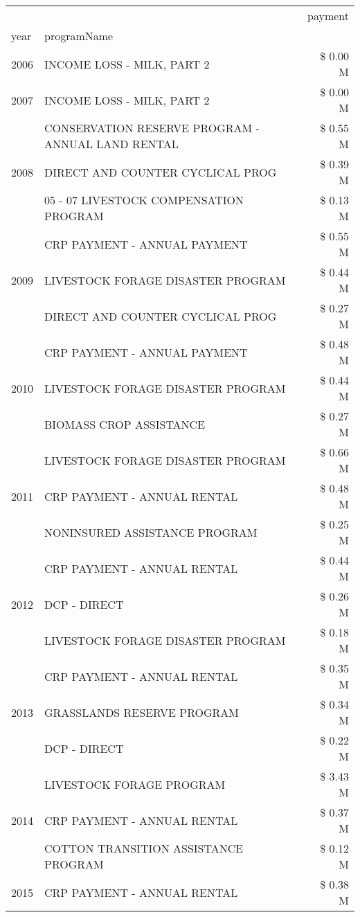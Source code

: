 \begin{tabular}{llr}
\toprule
 &  & payment \\
year & programName &  \\
\midrule
2006 & INCOME LOSS - MILK, PART 2 & \$ 0.00 M \\
\cline{1-3}
2007 & INCOME LOSS - MILK, PART 2 & \$ 0.00 M \\
\cline{1-3}
\multirow[t]{3}{*}{2008} & CONSERVATION RESERVE PROGRAM - ANNUAL LAND RENTAL & \$ 0.55 M \\
 & DIRECT AND COUNTER CYCLICAL PROG & \$ 0.39 M \\
 & 05 - 07 LIVESTOCK COMPENSATION PROGRAM & \$ 0.13 M \\
\cline{1-3}
\multirow[t]{3}{*}{2009} & CRP PAYMENT - ANNUAL PAYMENT & \$ 0.55 M \\
 & LIVESTOCK FORAGE DISASTER  PROGRAM & \$ 0.44 M \\
 & DIRECT AND COUNTER CYCLICAL PROG & \$ 0.27 M \\
\cline{1-3}
\multirow[t]{3}{*}{2010} & CRP PAYMENT - ANNUAL PAYMENT & \$ 0.48 M \\
 & LIVESTOCK FORAGE DISASTER  PROGRAM & \$ 0.44 M \\
 & BIOMASS CROP ASSISTANCE & \$ 0.27 M \\
\cline{1-3}
\multirow[t]{3}{*}{2011} & LIVESTOCK FORAGE DISASTER PROGRAM & \$ 0.66 M \\
 & CRP PAYMENT - ANNUAL RENTAL & \$ 0.48 M \\
 & NONINSURED ASSISTANCE PROGRAM & \$ 0.25 M \\
\cline{1-3}
\multirow[t]{3}{*}{2012} & CRP PAYMENT - ANNUAL RENTAL & \$ 0.44 M \\
 & DCP - DIRECT & \$ 0.26 M \\
 & LIVESTOCK FORAGE DISASTER PROGRAM & \$ 0.18 M \\
\cline{1-3}
\multirow[t]{3}{*}{2013} & CRP PAYMENT - ANNUAL RENTAL & \$ 0.35 M \\
 & GRASSLANDS RESERVE PROGRAM & \$ 0.34 M \\
 & DCP - DIRECT & \$ 0.22 M \\
\cline{1-3}
\multirow[t]{3}{*}{2014} & LIVESTOCK FORAGE PROGRAM & \$ 3.43 M \\
 & CRP PAYMENT - ANNUAL RENTAL & \$ 0.37 M \\
 & COTTON TRANSITION ASSISTANCE PROGRAM & \$ 0.12 M \\
\cline{1-3}
\multirow[t]{3}{*}{2015} & CRP PAYMENT - ANNUAL RENTAL & \$ 0.38 M \\

\end{tabular}
